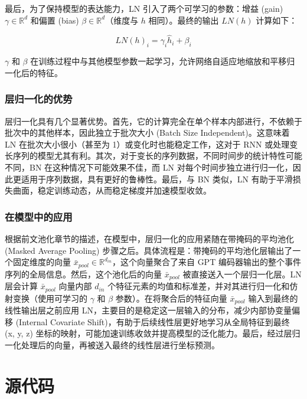 最后，为了保持模型的表达能力，LN 引入了两个可学习的参数：增益 (gain) $\gamma \in \mathbb{R}^{d}$ 和偏置 (bias) $\beta \in \mathbb{R}^{d}$（维度与 $h$ 相同）。最终的输出 $LN(h)$ 计算如下：

\[ LN(h)_i = \gamma_i \hat{h}_i + \beta_i \]

$\gamma$ 和 $\beta$ 在训练过程中与其他模型参数一起学习，允许网络自适应地缩放和平移归一化后的特征。

\subsection{层归一化的优势}

层归一化具有几个显著优势。首先，它的计算完全在单个样本内部进行，不依赖于批次中的其他样本，因此独立于批次大小 (Batch Size Independent)。这意味着 LN 在批次大小很小（甚至为 1）或变化时也能稳定工作，这对于 RNN 或处理变长序列的模型尤其有利。其次，对于变长的序列数据，不同时间步的统计特性可能不同，BN 在这种情况下可能效果不佳，而 LN 对每个时间步独立进行归一化，因此更适用于序列数据，具有更好的鲁棒性。最后，与 BN 类似，LN 有助于平滑损失曲面，稳定训练动态，从而稳定梯度并加速模型收敛。

\subsection{在模型中的应用}

根据前文池化章节的描述，在模型中，层归一化的应用紧随在带掩码的平均池化 (Masked Average Pooling) 步骤之后。具体流程是：带掩码的平均池化层输出了一个固定维度的向量 $\bar{x}_{pool} \in \mathbb{R}^{d_{in}}$，这个向量聚合了来自 GPT 编码器输出的整个事件序列的全局信息。然后，这个池化后的向量 $\bar{x}_{pool}$ 被直接送入一个层归一化层。LN 层会计算 $\bar{x}_{pool}$ 向量内部 $d_{in}$ 个特征元素的均值和标准差，并对其进行归一化和仿射变换（使用可学习的 $\gamma$ 和 $\beta$ 参数）。在将聚合后的特征向量 $\bar{x}_{pool}$ 输入到最终的线性输出层之前应用 LN，主要目的是稳定这一层输入的分布，减少内部协变量偏移 (Internal Covariate Shift)，有助于后续线性层更好地学习从全局特征到最终 (x, y, z) 坐标的映射，可能加速训练收敛并提高模型的泛化能力。最后，经过层归一化处理后的向量，再被送入最终的线性层进行坐标预测。

\chapter{源代码}


